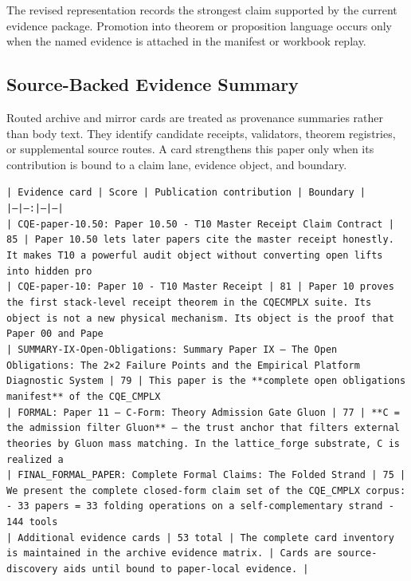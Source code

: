 \documentclass[11pt]{article}
\begin{document}
The revised representation records the strongest claim supported by the current evidence package. Promotion into theorem or proposition language occurs only when the named evidence is attached in the manifest or workbook replay.

\subsection*{Source-Backed Evidence Summary}

Routed archive and mirror cards are treated as provenance summaries rather than
body text. They identify candidate receipts, validators, theorem registries, or
supplemental source routes. A card strengthens this paper only when its
contribution is bound to a claim lane, evidence object, and boundary.

\noindent\texttt{| Evidence card | Score | Publication contribution | Boundary |}\\
\noindent\texttt{|---|---:|---|---|}\\
\noindent\texttt{| CQE-paper-10.50: Paper 10.50 - T10 Master Receipt Claim Contract | 85 | Paper 10.50 lets later papers cite the master receipt honestly. It makes T10 a powerful audit object without converting open lifts into hidden pro}\\
\noindent\texttt{| CQE-paper-10: Paper 10 - T10 Master Receipt | 81 | Paper 10 proves the first stack-level receipt theorem in the CQECMPLX suite. Its object is not a new physical mechanism. Its object is the proof that Paper 00 and Pape}\\
\noindent\texttt{| SUMMARY-IX-Open-Obligations: Summary Paper IX — The Open Obligations: The 2×2 Failure Points and the Empirical Platform Diagnostic System | 79 | This paper is the **complete open obligations manifest** of the CQE\_CMPLX}\\
\noindent\texttt{| FORMAL: Paper 11 — C-Form: Theory Admission Gate Gluon | 77 | **C = the admission filter Gluon** — the trust anchor that filters external theories by Gluon mass matching. In the lattice\_forge substrate, C is realized a}\\
\noindent\texttt{| FINAL\_FORMAL\_PAPER: Complete Formal Claims: The Folded Strand | 75 | We present the complete closed-form claim set of the CQE\_CMPLX corpus: - 33 papers = 33 folding operations on a self-complementary strand - 144 tools}\\
\noindent\texttt{| Additional evidence cards | 53 total | The complete card inventory is maintained in the archive evidence matrix. | Cards are source-discovery aids until bound to paper-local evidence. |}\\
\end{document}
